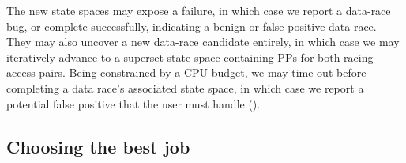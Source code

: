 The new state spaces may expose a failure, in which case we report a data-race bug,
or complete successfully, indicating a benign or false-positive data race.
They may also uncover a new data-race candidate entirely, %
in which case we may iteratively advance to a superset state space containing PPs for both racing access pairs.
Being constrained by a CPU budget,
we may time out before completing a data race's associated state space,
in which case we report a potential false positive that the user must handle (\sect{\ref{sec:future}}).



\subsection{Choosing the best job}

